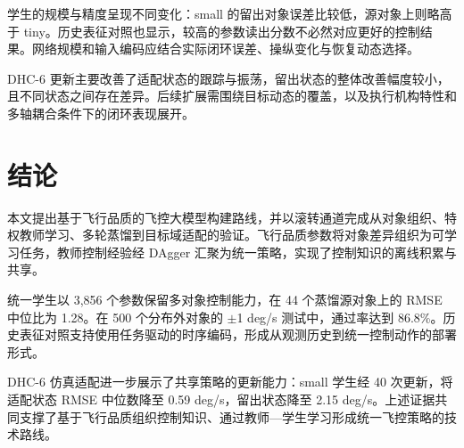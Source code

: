 \documentclass[UTF8,a4paper,11pt,fontset=fandol,scheme=plain]{ctexart}
\begin{document}
学生的规模与精度呈现不同变化：small 的留出对象误差比较低，源对象上则略高于 tiny。历史表征对照也显示，较高的参数读出分数不必然对应更好的控制结果。网络规模和输入编码应结合实际闭环误差、操纵变化与恢复动态选择。

DHC-6 更新主要改善了适配状态的跟踪与振荡，留出状态的整体改善幅度较小，且不同状态之间存在差异。后续扩展需围绕目标动态的覆盖，以及执行机构特性和多轴耦合条件下的闭环表现展开。

\FloatBarrier
\section{结论}
\hypertarget{s7}{}\label{s7}
本文提出基于飞行品质的飞控大模型构建路线，并以滚转通道完成从对象组织、特权教师学习、多轮蒸馏到目标域适配的验证。飞行品质参数将对象差异组织为可学习任务，教师控制经验经 DAgger 汇聚为统一策略，实现了控制知识的离线积累与共享。

统一学生以 3,856 个参数保留多对象控制能力，在 44 个蒸馏源对象上的 RMSE 中位比为 1.28。在 500 个分布外对象的 \ensuremath{\pm}1 deg/s 测试中，通过率达到 86.8\%。历史表征对照支持使用任务驱动的时序编码，形成从观测历史到统一控制动作的部署形式。

DHC-6 仿真适配进一步展示了共享策略的更新能力：small 学生经 40 次更新，将适配状态 RMSE 中位数降至 0.59 deg/s，留出状态降至 2.15 deg/s。上述证据共同支撑了基于飞行品质组织控制知识、通过教师—学生学习形成统一飞控策略的技术路线。
\end{document}
